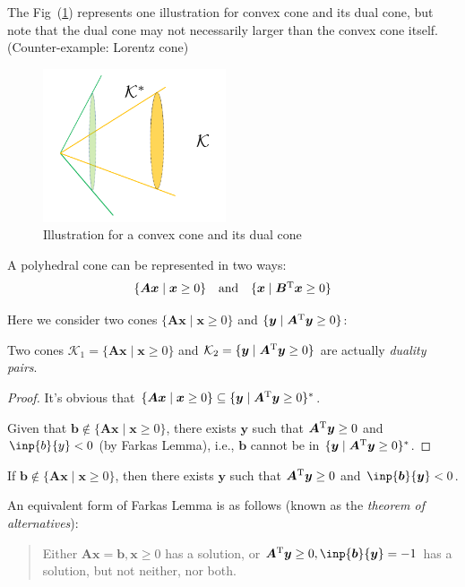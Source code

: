 The Fig~(\ref{fig:2:6}) represents one illustration for convex cone and its dual cone, but note that the dual cone may not necessarily larger than the convex cone itself. (Counter-example: Lorentz cone)
\begin{figure}
\centering
\includegraphics[width=0.48\textwidth]{Second_lecture/p_8}
\caption{Illustration for a convex cone and its dual cone}
\label{fig:2:6}
\end{figure}

A polyhedral cone can be represented in two ways:
\[
\begin{array}{lll}
\{\bm A\bm x\mid\bm x\ge0\}
&
\mbox{and}
&
\{\bm x\mid \bm B^{\mathrm T}\bm x\ge0\}
\end{array}
\]

Here we consider two cones $\{\bm A\bm x\mid \bm x\ge0\}$ and $\{\bm y\mid\bm A^{\mathrm T}\bm y\ge0\}$:
\begin{theorem}
Two cones $\mathcal{K}_1=\{\bm A\bm x\mid \bm x\ge0\}$ and $\mathcal{K}_2=\{\bm y\mid\bm A^{\mathrm T}\bm y\ge0\}$ are actually \emph{duality pairs}.
\end{theorem}
\begin{proof}
It's obvious that $\{\bm A\bm x\mid\bm x\ge0\}\subseteq\{\bm y\mid\bm A^{\mathrm T}\bm y\ge0\}^*$.

Given that $\bm b\notin \{\bm A\bm x\mid\bm x\ge0\}$, there exists $\bm y$ such that $\bm A^{\mathrm T}\bm y\ge0$ and $\inp{b}{y}<0$ (by Farkas Lemma), i.e., $\bm b$ cannot be in $\{\bm y\mid\bm A^{\mathrm T}\bm y\ge0\}^*$.
\end{proof}

\begin{theorem}\label{The:2:3}
If $\bm b\notin\{\bm A\bm x\mid\bm x\ge0\}$, then there exists $\bm y$ such that $\bm A^{\mathrm T}\bm y\ge0$ and $\inp{\bm b}{\bm y}<0$.
\end{theorem}
An equivalent form of Farkas Lemma is as follows (known as the \emph{theorem of alternatives}):
\begin{quotation}
Either $\bm A\bm x=\bm b,\bm x\ge0$ has a solution, or $\bm A\trans\bm y\ge0,\inp{\bm b}{\bm y}=-1$ has a solution, but not neither, nor both.
\end{quotation}

